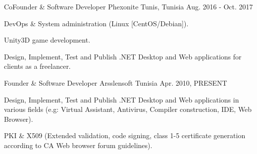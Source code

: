 \begin{cventries}
  \cventry
    {CoFounder \& Software Developer} %
    {Phexonite} %
    {Tunis, Tunisia} %
    {Aug. 2016 - Oct. 2017} %
    {
      \begin{cvitems} %
        \item {DevOps \& System administration (Linux [CentOS/Debian]).}
        \item {Unity3D game development.}
        \item {Design, Implement, Test and Publish .NET Desktop and Web applications for clients as a freelancer.}
      \end{cvitems}
    }

  \cventry
    {Founder \& Software Developer} %
    {Arsslensoft} %
    {Tunisia} %
    {Apr. 2010, PRESENT} %
    {
      \begin{cvitems} %
        \item {Design, Implement, Test and Publish .NET Desktop and Web applications in various fields (e.g: Virtual Assistant, Antivirus, Compiler construction, IDE, Web Browser).}
        \item {PKI \& X509 (Extended validation, code signing, class 1-5 certificate generation according to CA Web browser forum guidelines).}
      \end{cvitems}
    }

\end{cventries}
